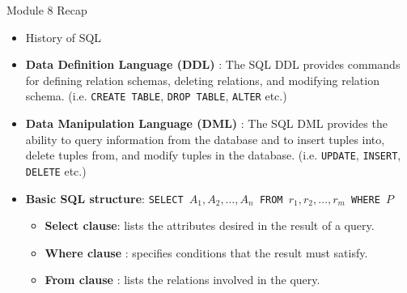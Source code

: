 \documentclass[aspectratio=169, xcolor=dvipsnames]{beamer}
\begin{document}
\begin{frame}{Module 8 Recap}
    \begin{itemize}[<+->]
        \item History of SQL
        \item \textbf{Data Definition Language (DDL)} : The SQL DDL provides commands for defining relation schemas, deleting relations, and modifying relation schema. (i.e. \texttt{CREATE TABLE}, \texttt{DROP TABLE}, \texttt{ALTER} etc.)
        \item \textbf{Data Manipulation Language (DML)} : The SQL DML provides the ability to query information from the database and to insert tuples into, delete tuples from, and modify tuples in the database. (i.e. \texttt{UPDATE}, \texttt{INSERT}, \texttt{DELETE} etc.)
        \item \textbf{Basic SQL structure}: \texttt{SELECT $A_1, A_2, \dots , A_n$ FROM $r_1, r_2, \dots , r_m$ WHERE $P$}
        \begin{itemize}
            \item[$\triangleright$] \textbf{Select clause}: lists the attributes desired in the result of a query.
            \item[$\triangleright$] \textbf{Where clause} : specifies conditions that the result must satisfy.
            \item[$\triangleright$] \textbf{From clause} : lists the relations involved in the query.
        \end{itemize}
    \end{itemize}
\end{frame}
\end{document}
